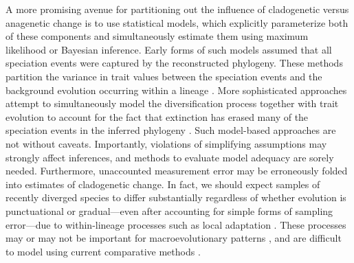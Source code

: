 A more promising avenue for partitioning out the influence of cladogenetic versus anagenetic change is to use statistical models, which explicitly parameterize both of these components and simultaneously estimate them using maximum likelihood or Bayesian inference. Early forms of such models assumed that all speciation events were captured by the reconstructed phylogeny. These methods partition the variance in trait values between the speciation events and the background evolution occurring within a lineage \citep{Pagel1997, Mooers1999, Bokma2002, Wagner2000, WagnerMarcot2010}. More sophisticated approaches attempt to simultaneously model the diversification process together with trait evolution \citep[][see \textsc{box 3} for details]{Bokma2002, Mattila2008, Bokma2008, Bokma2010, Goldberg2012, MagnusonFord2012, Simpson2013} to account for the fact that extinction has erased many of the speciation events in the inferred phylogeny \citep{Nee1992, Nee1994, Nee2006, Ricklefs2007}. Such model-based approaches are not without caveats. Importantly, violations of simplifying assumptions may strongly affect inferences, and methods to evaluate model adequacy are sorely needed. Furthermore, unaccounted measurement error may be erroneously folded into estimates of cladogenetic change. In fact, we should expect samples of recently diverged species to differ substantially regardless of whether evolution is punctuational or gradual---even after accounting for simple forms of sampling error---due to within-lineage processes such as local adaptation \citep{Uyeda2011, Hansen2012book}. These processes may or may not be important for macroevolutionary patterns \citep{Futuyma1987,Futuyma2010}, and are difficult to model using current comparative methods \citep{Stone2011}.
	
